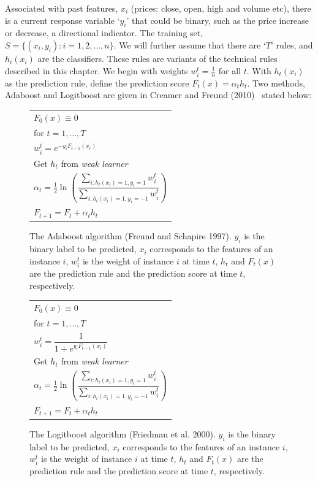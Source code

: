 Associated with past features, $x_i$ (prices: close, open, high and volume etc), there is a current response variable `$y_i$' that could be binary, such as the price increase or decrease, a directional indicator. The training set, $S= \{ (x_i,y_i) \colon i= 1,2,\ldots,n\}$. We will further assume that there are `$T$' rules, and $h_i(x_i)$ are the classifiers. These rules are variants of the technical rules described in this chapter. We begin with weights $w_i^t= \frac{1}{n}$ for all $t$. With $h_t(x_i)$ as the prediction rule, define the prediction score $F_t(x)= \alpha_t h_t$. Two methods, Adaboost and Logitboost are given in Creamer and Freund (2010)~\cite{creamer2010} stated below: 


	\begin{figure}[!ht]
	\centering
	\begin{tabular}{l}
	$F_0(x) \equiv 0$ \\
	for $t= 1,\ldots,T$ \\
	\quad\quad $w_i^t= e^{-y_i F_{t-1}(x_i)}$ \\
	\quad\quad Get $h_t$ from \emph{weak learner} \\
	\quad\quad $\alpha_t= \frac{1}{2} \ln \left( \dfrac{\sum_{i: h_t(x_i)= 1, y_i=1} w_i^t}{\sum_{i: h_t(x_i)=1, y_i= -1} w_i^t} \right)$ \\
	\quad\quad  $F_{t+1}= F_t + \alpha_t h_t$ 
	\end{tabular}
	\caption{The Adaboost algorithm (Freund and Schapire 1997). $y_i$ is the binary label to be predicted, $x_i$ corresponds to the features of an instance $i$, $w_i^t$ is the weight of instance $i$ at time $t$, $h_t$ and $F_t(x)$ are the prediction rule and the prediction score at time $t$, respectively.}
	\end{figure}

	\begin{figure}[!ht]
	\centering
	\begin{tabular}{l}
	$F_0(x) \equiv 0$ \\
	for $t= 1,\ldots,T$ \\
	\quad\quad $w_i^t= \dfrac{1}{1+ e^{y_i F_{t-1}(x_i)}}$ \\
	\quad\quad Get $h_t$ from \emph{weak learner} \\
	\quad\quad $\alpha_t= \frac{1}{2} \ln \left( \dfrac{\sum_{i: h_t(x_i)= 1, y_i=1} w_i^t}{\sum_{i: h_t(x_i)=1, y_i= -1} w_i^t} \right)$ \\
	\quad\quad $F_{t+1}= F_t + \alpha_t h_t$ 
	\end{tabular}
	\caption{The Logitboost algorithm (Friedman et al. 2000). $y_i$ is the binary label to be predicted, $x_i$ corresponds to the features of an instance $i$, $w_i^t$ is the weight of instance $i$ at time $t$, $h_t$ and $F_t(x)$ are the prediction rule and the prediction score at time $t$, respectively.}
	\end{figure}


